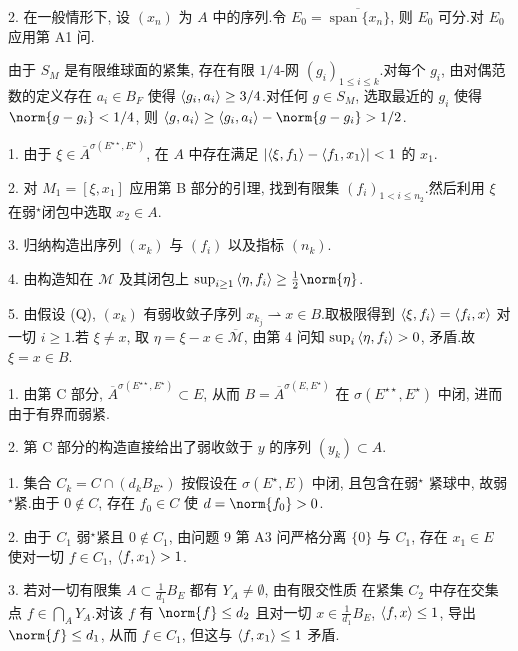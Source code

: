 2. 在一般情形下, 设 $(x_n)$ 为 $A$ 中的序列.令 $E_0=\overline{\operatorname{span}\{x_n\}}$,
则 $E_0$ 可分.对 $E_0$ 应用第 A1 问.


由于 $S_M$ 是有限维球面的紧集, 存在有限 $1/4$-网 $(g_i)_{1\le i\le k}$.对每个 $g_i$,
由对偶范数的定义存在 $a_i\in B_F$ 使得 $\left\langle g_i,a_i\right\rangle\ge3/4$.对任何 $g\in S_M$,
选取最近的 $g_i$ 使得 $\norm{g-g_i}<1/4$, 则 $\dual{g}{a_i}\ge\dual{g_i}{a_i}-\norm{g-g_i}>1/2$.


1. 由于 $\xi\in\overline A^{\sigma(E^{\star\star},E^\star)}$, 在 $A$ 中存在满足
$\left|\left\langle \xi,f_1\right\rangle-\left\langle f_1,x_1\right\rangle\right|<1$ 的 $x_1$.

2. 对 $M_1=[\xi,x_1]$ 应用第 B 部分的引理, 找到有限集 $(f_i)_{1<i\le n_2}$.然后利用
$\xi$ 在弱$^\star$闭包中选取 $x_2\in A$.

3. 归纳构造出序列 $(x_k)$ 与 $(f_i)$ 以及指标 $(n_k)$.

4. 由构造知在 $\mathcal{M}$ 及其闭包上 $\sup_{i\ge1}\dual{\eta}{f_i}\ge\frac12\norm{\eta}$.

5. 由假设 (Q), $(x_k)$ 有弱收敛子序列 $x_{k_j}\rightharpoonup x\in B$.取极限得到
$\left\langle \xi,f_i\right\rangle=\left\langle f_i,x\right\rangle$ 对一切 $i\ge1$.若 $\xi\ne x$, 取 $\eta=\xi-x\in\overline{\mathcal{M}}$,
由第 4 问知 $\sup_i\left\langle \eta,f_i\right\rangle>0$, 矛盾.故 $\xi=x\in B$.


1. 由第 C 部分, $\overline A^{\sigma(E^{\star\star},E^\star)}\subset E$, 从而
$B=\overline A^{\sigma(E,E^\star)}$ 在 $\sigma(E^{\star\star},E^\star)$ 中闭,
进而由于有界而弱紧.

2. 第 C 部分的构造直接给出了弱收敛于 $y$ 的序列 $(y_k)\subset A$.



1. 集合 $C_k=C\cap(d_kB_{E^\star})$ 按假设在 $\sigma(E^\star,E)$ 中闭, 且包含在弱$^\star$
紧球中, 故弱$^\star$紧.由于 $0\notin C$, 存在 $f_0\in C$ 使 $d=\norm{f_0}>0$.

2. 由于 $C_1$ 弱$^\star$紧且 $0\notin C_1$, 由问题 9 第 A3 问严格分离 $\{0\}$ 与 $C_1$,
存在 $x_1\in E$ 使对一切 $f\in C_1$, $\left\langle f,x_1\right\rangle>1$.

3. 若对一切有限集 $A\subset\frac{1}{d_1}B_E$ 都有 $Y_A\ne\emptyset$, 由有限交性质
在紧集 $C_2$ 中存在交集点 $f\in\bigcap_AY_A$.对该 $f$ 有 $\norm{f}\le d_2$ 且对一切
$x\in\frac{1}{d_1}B_E$, $\left\langle f,x\right\rangle\le1$, 导出 $\norm{f}\le d_1$, 从而 $f\in C_1$,
但这与 $\left\langle f,x_1\right\rangle\le1$ 矛盾.

